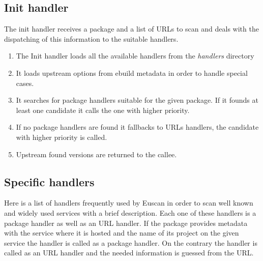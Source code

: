 \subsection{Init handler}
The init handler receives a package and a list of URLs to scan and deals with the dispatching of this information to the suitable handlers.
\begin{enumerate}
\item The Init handler loads all the available handlers from the \emph{handlers} directory
\item It loads upstream options from ebuild metadata in order to handle special cases.
\item It searches for package handlers suitable for the given package. If it founds at least one candidate it calls the one with higher priority.
\item If no package handlers are found it fallbacks to URLs handlers, the candidate with higher priority is called.
\item Upstream found versions are returned to the callee.
\end{enumerate}

\subsection{Specific handlers}
Here is a list of handlers frequently used by Euscan in order to scan well known and widely used services with a brief description. Each one of these handlers is a package handler as well as an URL handler. If the package provides metadata with the service where it is hosted and the name of its project on the given service the handler is called as a package handler. On the contrary the handler is called as an URL handler and the needed information is guessed from the URL.

